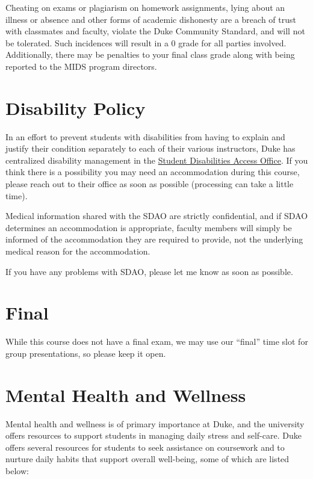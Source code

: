 \documentclass[12pt]{article}
\begin{document}
Cheating on exams or plagiarism on homework assignments, lying about an illness or absence and other forms of academic dishonesty are a breach of trust with classmates and faculty, violate the Duke Community Standard, and will not be tolerated. Such incidences will result in a 0 grade for all parties involved. Additionally, there may be penalties to your final class grade along with being reported to the MIDS program directors.

\section{Disability Policy}

In an effort to prevent students with disabilities from having to explain and justify their condition separately to each of their various instructors, Duke has centralized disability management in the \href{https://access.duke.edu/students}{Student Disabilities Access Office}. If you think there is a possibility you may need an accommodation during this course, please reach out to their office as soon as possible (processing can take a little time).

Medical information shared with the SDAO are strictly confidential, and if SDAO determines an accommodation is appropriate, faculty members will simply be informed of the accommodation they are required to provide, not the underlying medical reason for the accommodation.

If you have any problems with SDAO, please let me know as soon as possible.

\section{Final}

While this course does not have a final exam, we may use our ``final'' time slot for group presentations, so please keep it open.

\section{Mental Health and Wellness}

Mental health and wellness is of primary importance at Duke, and the university offers resources to support students in managing daily stress and self-care. Duke offers several resources for students to seek assistance on coursework and to nurture daily habits that support overall well-being, some of which are listed below:
\end{document}
